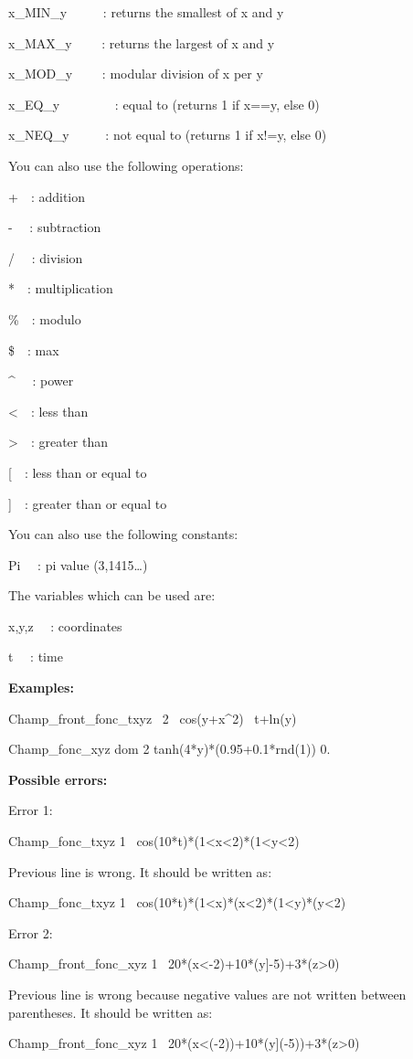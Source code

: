 x\_MIN\_y \ \ \ \ \ : returns the smallest of x and y

x\_MAX\_y \ \ \ \ : returns the largest of x and y

x\_MOD\_y \ \ \ \ : modular division of x per y

x\_EQ\_y \ \ \ \ \ \ \ \ : equal to (returns 1 if x==y, else 0)

x\_NEQ\_y \ \ \ \ \ : not equal to (returns 1 if x!=y, else 0) 


\bigskip

You can also use the following operations:

+\ \ : addition

{}- \ \ : subtraction

/ \ \ : division

*\ \ : multiplication

\%\ \ : modulo

\$\ \ : max

\^{} \ \ : power

{\textless}\ \ : less than

{\textgreater}\ \ : greater than

[\ \ : less than or equal to

]\ \ : greater than or equal to


\bigskip

You can also use the following constants:

Pi \ \ : pi value (3,1415{\dots})


\bigskip

The variables which can be used are:

x,y,z \ \ : coordinates 

t \ \ : time


\bigskip

{\bfseries
Examples:}

Champ\_front\_fonc\_txyz \ 2 \ cos(y+x\^{}2) \ t+ln(y)

Champ\_fonc\_xyz dom 2 tanh(4*y)*(0.95+0.1*rnd(1)) 0.


\bigskip

{\bfseries
Possible errors:}

Error 1:

Champ\_fonc\_txyz 1 \ cos(10*t)*(1{\textless}x{\textless}2)*(1{\textless}y{\textless}2)

Previous line is wrong. It should be written as:

Champ\_fonc\_txyz 1 \ cos(10*t)*(1{\textless}x)*(x{\textless}2)*(1{\textless}y)*(y{\textless}2)

\bigskip
Error 2:

Champ\_front\_fonc\_xyz 1 \ 20*(x{\textless}-2)+10*(y]-5)+3*(z{\textgreater}0)

Previous line is wrong because negative values are not written between parentheses. It should be written as:

Champ\_front\_fonc\_xyz 1 \ 20*(x{\textless}(-2))+10*(y](-5))+3*(z{\textgreater}0)
